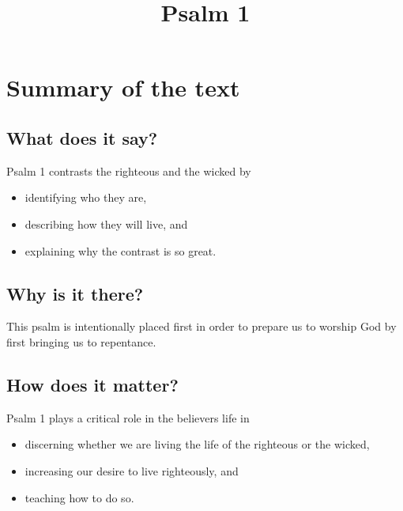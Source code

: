 \documentclass{article}
\title{Psalm 1}
\newcommand{\BI}{\begin{itemize}\item}
\newcommand{\I}{\item}
\newcommand{\EI}{\end{itemize}}
\begin{document}
\maketitle

\section{Summary of the text}
\subsection{What does it say?}
Psalm 1 contrasts the righteous and the wicked by
    \BI identifying who they are,
    \I  describing how they will live, and
    \I explaining why the contrast is so great. \EI
\subsection{Why is it there?}
This psalm is intentionally placed first
    in order to prepare us to worship God
    by first bringing us to repentance.
\subsection{How does it matter?}
Psalm 1 plays a critical role in the believers life in
    \BI discerning whether we are living 
            the life of the righteous or the wicked,
    \I  increasing our desire to live righteously, and
    \I  teaching how to do so. \EI
\end{document}
